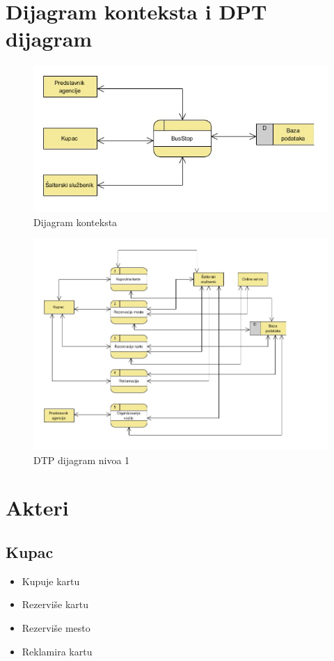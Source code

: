 \section{Dijagram konteksta i DPT dijagram}
\begin{figure}[!htb] 
	\centering
	\includegraphics[width=0.7\linewidth]{"../Slike/Dijagram konteksta"}
	\caption{Dijagram konteksta}
	\label{fig:dijagram-konteksta}
\end{figure}

\begin{figure}[!htb]
	\centering
	\includegraphics[width=0.7\linewidth]{../Slike/DTP}
	\caption{DTP dijagram nivoa 1}
	\label{fig:dtp}
\end{figure}




\newpage
\section{Akteri}
\subsection{Kupac}
\begin{itemize}
	\item Kupuje kartu
	\item Rezervi\v se kartu
	\item Rezervi\v se mesto
	\item Reklamira kartu
\end{itemize}

